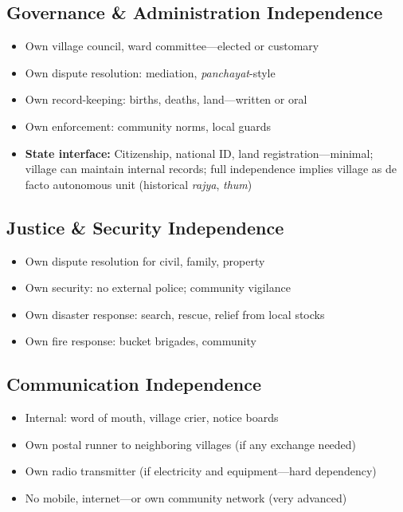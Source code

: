 \documentclass[11pt,a4paper]{article}
\begin{document}
\subsection{Governance \& Administration Independence}
\begin{itemize}
    \item Own village council, ward committee---elected or customary
    \item Own dispute resolution: mediation, \textit{panchayat}-style
    \item Own record-keeping: births, deaths, land---written or oral
    \item Own enforcement: community norms, local guards
    \item \textbf{State interface:} Citizenship, national ID, land registration---minimal; village can maintain internal records; full independence implies village as de facto autonomous unit (historical \textit{rajya}, \textit{thum})
\end{itemize}

\subsection{Justice \& Security Independence}
\begin{itemize}
    \item Own dispute resolution for civil, family, property
    \item Own security: no external police; community vigilance
    \item Own disaster response: search, rescue, relief from local stocks
    \item Own fire response: bucket brigades, community
\end{itemize}

\subsection{Communication Independence}
\begin{itemize}
    \item Internal: word of mouth, village crier, notice boards
    \item Own postal runner to neighboring villages (if any exchange needed)
    \item Own radio transmitter (if electricity and equipment---hard dependency)
    \item No mobile, internet---or own community network (very advanced)
\end{itemize}
\end{document}
